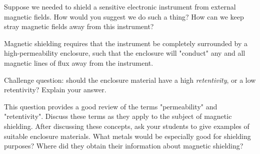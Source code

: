 

Suppose we needed to shield a sensitive electronic instrument from external magnetic fields.  How would you suggest we do such a thing?  How can we keep stray magnetic fields away from this instrument?







Magnetic shielding requires that the instrument be completely surrounded by a high-permeability enclosure, such that the enclosure will "conduct" any and all magnetic lines of flux away from the instrument.

\vskip 10pt

Challenge question: should the enclosure material have a high {\it retentivity}, or a low retentivity?  Explain your answer.







This question provides a good review of the terms "permeability" and "retentivity".  Discuss these terms as they apply to the subject of magnetic shielding.  After discussing these concepts, ask your students to give examples of suitable enclosure materials.  What metals would be especially good for shielding purposes?  Where did they obtain their information about magnetic shielding?




